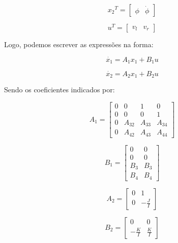 \documentclass[12pt]{article}
\begin{document}
\begin{equation*}
    {x_2}^{T} = \begin{bmatrix}
      \phi & \dot{\phi} 
    \end{bmatrix}
\end{equation*}

\begin{equation*}
    u^{T} = \begin{bmatrix}
      v_l & v_r
    \end{bmatrix}
\end{equation*}

Logo, podemos escrever as expressões na forma:

\begin{equation}
    \dot{x_1} = A_1 x_1 + B_1 u
\end{equation}

\begin{equation}
    \dot{x_2} = A_2 x_1 + B_2 u
\end{equation}

Sendo os coeficientes indicados por:

\begin{equation}
    A_1 = \begin{bmatrix}
    0 & 0 & 1 & 0\\
    0 & 0 & 0 & 1\\
    0 & A_{32} & A_{33} & A_{34}\\
    0 & A_{42} & A_{43} & A_{44}
    \end{bmatrix} 
\end{equation}

\begin{equation}
    B_1 = \begin{bmatrix}
    0 & 0 \\
    0 & 0 \\
    B_3 & B_3\\
    B_4 & B_4
    \end{bmatrix}
\end{equation}

\begin{equation}
    A_2 = \begin{bmatrix}
    0 & 1\\
    0 & -\frac{J}{I}
    \end{bmatrix}
\end{equation}

\begin{equation}
    B_2 = \begin{bmatrix}
    0 & 0 \\
    -\frac{K}{I} & \frac{K}{I}
    \end{bmatrix}
\end{equation}
\end{document}
